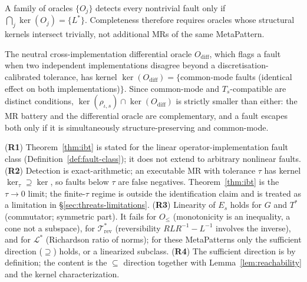 \begin{corollary*}
A family of oracles $\{O_j\}$ detects every nontrivial fault only if
$\bigcap_j\ker(O_j)=\{L^{*}\}$. Completeness therefore requires oracles whose
structural kernels intersect trivially, not additional MRs of the same MetaPattern.
\end{corollary*}

\begin{corollary*}
The neutral cross-implementation differential oracle $O_{\mathrm{diff}}$, which flags
a fault when two independent implementations disagree beyond a discretisation-
calibrated tolerance, has kernel $\ker(O_{\mathrm{diff}})=\{$common-mode faults
(identical effect on both implementations)$\}$. Since common-mode and
$T_s$-compatible are distinct conditions, $\ker(\rho_{\iota,s})\cap\ker(O_{\mathrm{diff}})$
is strictly smaller than either: the MR battery and the differential oracle are
complementary, and a fault escapes both only if it is simultaneously
structure-preserving and common-mode.
\end{corollary*}

\begin{remark}
\label{rem:ibt-scope}
(\textbf{R1}) Theorem~\ref{thm:ibt} is stated for the linear operator-implementation
fault class (Definition~\ref{def:fault-class}); it does not extend to arbitrary
nonlinear faults. (\textbf{R2}) Detection is exact-arithmetic; an executable MR with
tolerance $\tau$ has kernel $\ker_\tau\supseteq\ker$, so faults below $\tau$ are
false negatives. Theorem~\ref{thm:ibt} is the $\tau\to0$ limit; the finite-$\tau$
regime is outside the identification claim and is treated as a limitation in
\S\ref{sec:threats-limitations}.
(\textbf{R3}) Linearity of $E_s$ holds for $G$ and $T^{*}$ (commutator; symmetric
part). It fails for $O_\le$ (monotonicity is an inequality, a cone not a subspace),
for $\mathcal{T}^{*}_{\mathrm{rev}}$ (reversibility $R L R^{-1}-L^{-1}$ involves the inverse), and
for $\mathcal{L}^{*}$ (Richardson ratio of norms); for these MetaPatterns only the sufficient
direction ($\supseteq$) holds, or a linearized subclass. (\textbf{R4}) The sufficient
direction is by definition; the content is the $\subseteq$ direction together with
Lemma~\ref{lem:reachability} and the kernel characterization.
\end{remark}
